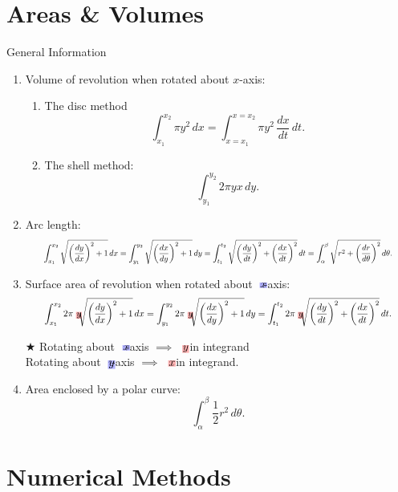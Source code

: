 \documentclass[oneside]{book}
\newcommand{\highlight}[2][red!50]{\mathpalette{\highlightwithstyle[#1]}{#2}}
\newcommand{\highlightwithstyle}[3][red!50]{
  \begingroup                         %
    \sbox0{$\mathsurround 0pt #2#3$}%
    \setlength{\fboxsep}{.5pt}        %
    \sbox2{\hspace{-.5pt}%
      \colorbox{#1}{\usebox0}%
    }%
    \dp2=\dp0 \ht2=\ht0 \wd2=\wd0     %
    \box2                             %
  \endgroup                           %
}
\begin{document}
\section{Areas \& Volumes}
\begin{stbox}{General Information}
  \begin{enumerate}
    \item Volume of revolution when rotated about \(x\)-axis: 
  \begin{enumerate}
    \item The disc method
    \[\int_{x_1}^{x_2}\pi y^2\,dx=\int_{x=x_1}^{x=x_2}\pi y^2\, \frac{dx}{dt}\,dt.\]
    \item The shell method:
    \[\int_{y_1}^{y_2}2\pi yx \,dy.\]
  \end{enumerate}
  \item Arc length:
  \begin{equation*}
    \resizebox{0.9\hsize}{!}{\(\displaystyle\int_{x_1}^{x_2}\sqrt{\left(\frac{dy}{dx}\right)^2+1}\,dx=\int_{y_1}^{y_2} \sqrt{\left(\frac{dx}{dy}\right)^2+1}\,dy=\int_{t_1}^{t_2}\sqrt{\left(\frac{dy}{dt}\right)^2+\left(\frac{dx}{dt}\right)^2}\,dt=\int_{\alpha}^{\beta}\sqrt{r^2+\left(\frac{dr}{d\theta}\right)^2}\,d\theta.\)}
    \end{equation*}
  \item Surface area of revolution when rotated about \(\highlight[blue!30]{x}\)-axis: 
  \begin{equation*}
    \resizebox{0.9\hsize}{!}{\(\displaystyle\int_{x_1}^{x_2}2\pi \highlight[red!30]{y} \sqrt{\left(\frac{dy}{dx}\right)^2+1}\,dx=\int_{y_1}^{y_2}2\pi \highlight[red!30]{y} \sqrt{\left(\frac{dx}{dy}\right)^2+1}\,dy=\int_{t_1}^{t_2}2\pi \highlight[red!30]{y} \sqrt{\left(\frac{dy}{dt}\right)^2+\left(\frac{dx}{dt}\right)^2}\,dt.\)}
    \end{equation*}
  \begin{flushleft}
    \(\bigstar\) Rotating about \(\highlight[blue!30]{x}\)-axis \(\implies\) \(\highlight[red!30]{y}\) in integrand\\
    \hphantom{\(\bigstar\)} Rotating about \(\highlight[blue!30]{y}\)-axis \(\implies\) \(\highlight[red!30]{x}\) in integrand.
  \end{flushleft}
  \item Area enclosed by a polar curve:
  \[\int_{\alpha}^{\beta}\frac{1}{2}r^2\,d\theta.\]
  \end{enumerate}
\end{stbox}
\section{Numerical Methods}
\end{document}
